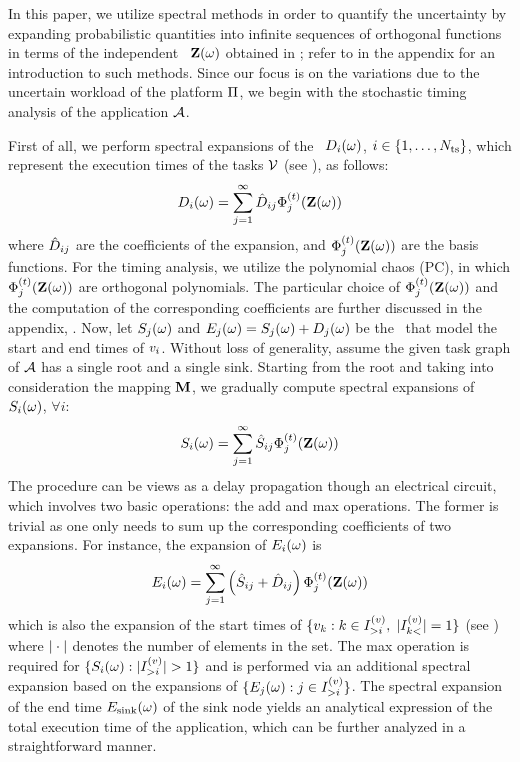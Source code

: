 In this paper, we utilize spectral methods in order to quantify the uncertainty by expanding probabilistic quantities into infinite sequences of orthogonal functions in terms of the independent \rvs\ $\mathbf{Z}(\omega)$ obtained in ; refer to  in the appendix for an introduction to such methods. Since our focus is on the variations due to the uncertain workload of the platform $\Pi$, we begin with the stochastic timing analysis of the application $\mathcal{A}$.

First of all, we perform spectral expansions of the \rvs\ $D_i(\omega)$, $i \in \{ 1, \dots, {N_\text{ts}} \}$, which represent the execution times of the tasks $\mathcal{V}$ (see ), as follows:
\[
  D_i(\omega) = \sum_{j = 1}^\infty \hat{D}_{ij} \Phi^{(t)}_j(\mathbf{Z}(\omega))
\]
where $\hat{D}_{ij}$ are the coefficients of the expansion, and $\Phi^{(t)}_j(\mathbf{Z}(\omega))$ are the basis functions. For the timing analysis, we utilize the polynomial chaos (PC), in which $\Phi^{(t)}_j(\mathbf{Z}(\omega))$ are orthogonal polynomials. The particular choice of $\Phi^{(t)}_j(\mathbf{Z}(\omega))$ and the computation of the corresponding coefficients are further discussed in the appendix, . Now, let $S_j(\omega)$ and $E_j(\omega) = S_j(\omega) + D_j(\omega)$ be the \rvs\ that model the start and end times of $v_i$. Without loss of generality, assume the given task graph of $\mathcal{A}$ has a single root and a single sink. Starting from the root and taking into consideration the mapping $\mathbf{M}$, we gradually compute spectral expansions of $S_i(\omega)$, $\forall i$:
\[
  S_i(\omega) = \sum_{j = 1}^\infty \hat{S}_{ij} \Phi^{(t)}_j(\mathbf{Z}(\omega))
\]
The procedure can be views as a delay propagation though an electrical circuit, which involves two basic operations: the add and max operations. The former is trivial as one only needs to sum up the corresponding coefficients of two expansions. For instance, the expansion of $E_i(\omega)$ is
\[
  E_i(\omega) = \sum_{j = 1}^\infty \left( \hat{S}_{ij} + \hat{D}_{ij} \right) \Phi^{(t)}_j(\mathbf{Z}(\omega))
\]
which is also the expansion of the start times of $\{ v_k: k \in I^{(v)}_{>i}, \; |I^{(v)}_{k<}| = 1 \}$ (see ) where $|\cdot|$ denotes the number of elements in the set. The max operation is required for $\{ S_i(\omega): |I^{(v)}_{>i}| > 1 \}$ and is performed via an additional spectral expansion based on the expansions of $\{ E_j(\omega): j \in I^{(v)}_{>i} \}$. The spectral expansion of the end time $E_\text{sink}(\omega)$ of the sink node yields an analytical expression of the total execution time of the application, which can be further analyzed in a straightforward manner.
